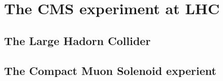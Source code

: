 \chapter{The CMS experiment at LHC}

\section{The Large Hadorn Collider}

\section{The Compact Muon Solenoid experient}
